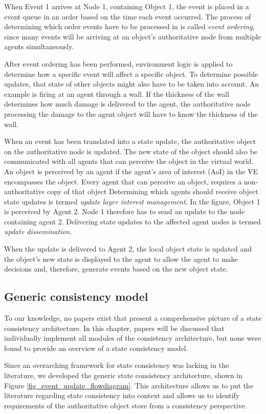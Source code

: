 When Event 1 arrives at Node 1, containing Object 1, the event is placed in a event queue in an order based on the time each event occurred. The process of determining which order events have to be processed in is called \emph{event ordering}, since many events will be arriving at an object's authoritative node from multiple agents simultaneously.

After event ordering has been performed, environment logic is applied to determine how a specific event will affect a specific object. To determine possible updates, that state of other objects might also have to be taken into account. An example is firing at an agent through a wall. If the thickness of the wall determines how much damage is delivered to the agent, the authoritative node processing the damage to the agent object will have to know the thickness of the wall.

When an event has been translated into a state update, the authoritative object on the authoritative node is updated. The new state of the object should also be communicated with all agents that can perceive the object in the virtual world. An object is perceived by an agent if the agent's area of interest (AoI)  in the VE encompasses the object. Every agent that can perceive an object, requires a non-authoritative copy of that object Determining which agents should receive object state updates is termed \emph{update layer interest management}. In the figure, Object 1 is perceived by Agent 2. Node 1 therefore has to send an update to the node containing agent 2. Delivering state updates to the affected agent nodes is termed \emph{update dissemination}.

When the update is delivered to Agent 2, the local object state is updated and the object's new state is displayed to the agent to allow the agent to make decisions and, therefore, generate events based on the new object state.

\subsection{Generic consistency model}
\label{generic_event_update_model}

To our knowledge, no papers exist that present a comprehensive picture of a state consistency architecture. In this chapter, papers will be discussed that individually implement all modules of the consistency architecture, but none were found to provide an overview of a state consistency model.

Since an overarching framework for state consistency was lacking in the literature, we developed the generic state consistency architecture, shown in Figure \ref{fig_event_update_flowdiagram}. This architecture allows us to put the literature regarding state consistency into context and allows us to identify requirements of the authoritative object store from a consistency perspective.

